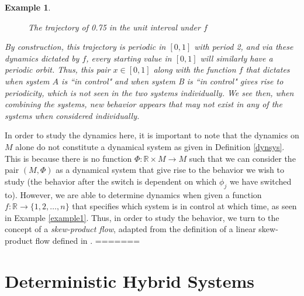 \documentclass[11pt]{article}
\newtheorem{ex}[thm]{Example}
\begin{document}
\begin{ex}
\begin{figure}[!ht]
\begin{center}
\caption{The trajectory of 0.75 in the unit interval under $f$}
\end{center}
\end{figure}

By construction, this trajectory is periodic in $[0,1]$ with period 2, and via these dynamics dictated by $f$, every starting value in $[0,1]$ will similarly have a periodic orbit. Thus, this pair $x\in[0,1]$ along with the function $f$ that dictates when system $A$ is ``in control" and when system B is ``in control" gives rise to periodicity, which is not seen in the two systems individually.   We see then, when combining the systems, new behavior appears that may not exist in any of the systems when considered individually.  \end{ex}

\indent In order to study the dynamics here, it is important to note that the dynamics on $M$ alone do not constitute a dynamical system as given in Definition \ref{dynsys}.  This is because there is no function $\Phi:\mathbb{R}\times M\rightarrow M$ such that we can consider the pair $(M,\Phi)$ as a dynamical system that give rise to the behavior we wish to study (the behavior after the switch is dependent on which $\phi_j$ we have switched to).  However, we are able to determine dynamics when given a function $f:\mathbb{R}\rightarrow\{1,2,\ldots,n\}$ that specifies which system is in control at which time, as seen in Example \ref{example1}. Thus, in order to study the behavior, we turn to the concept of a \emph{skew-product flow}, adapted from the definition of a linear skew-product flow defined in \cite{skewproduct}.
=======
\section{Deterministic Hybrid Systems}
\end{document}
